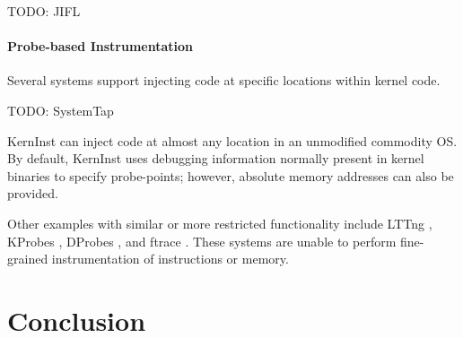 \documentclass[preprint]{sigplanconf}
\begin{document}
TODO: JIFL

\paragraph{Probe-based Instrumentation} Several systems support injecting code at specific locations within kernel code.

TODO: SystemTap

KernInst \cite{KernInst} can inject code at almost any location in an unmodified commodity OS. By default, KernInst uses debugging information normally present in kernel binaries to specify probe-points; however, absolute memory addresses can also be provided.

Other examples with similar or more restricted functionality include LTTng \cite{LTTng}, KProbes \cite{KProbes}, DProbes \cite{DProbes}, and ftrace \cite{ftrace}. These systems are unable to perform fine-grained instrumentation of instructions or memory.


\section{Conclusion}\label{sec:conclusion}






\end{document}
